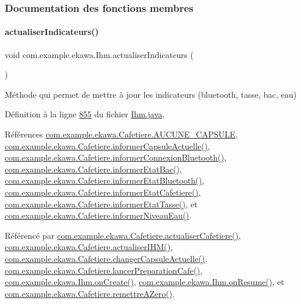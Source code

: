 \subsubsection{Documentation des fonctions membres}
\mbox{\label{classcom_1_1example_1_1ekawa_1_1_ihm_a2c3740dd5be20b3111b36649514fd41e}} 
\paragraph{\texorpdfstring{actualiser\+Indicateurs()}{actualiserIndicateurs()}}
{\footnotesize\ttfamily void com.\+example.\+ekawa.\+Ihm.\+actualiser\+Indicateurs (\begin{DoxyParamCaption}{ }\end{DoxyParamCaption})}



Méthode qui permet de mettre à jour les indicateurs (bluetooth, tasse, bac, eau) 



Définition à la ligne \hyperlink{_ihm_8java_source_l00855}{855} du fichier \hyperlink{_ihm_8java_source}{Ihm.\+java}.



Références \hyperlink{_cafetiere_8java_source_l00028}{com.\+example.\+ekawa.\+Cafetiere.\+A\+U\+C\+U\+N\+E\+\_\+\+C\+A\+P\+S\+U\+LE}, \hyperlink{_cafetiere_8java_source_l00235}{com.\+example.\+ekawa.\+Cafetiere.\+informer\+Capsule\+Actuelle()}, \hyperlink{_cafetiere_8java_source_l00275}{com.\+example.\+ekawa.\+Cafetiere.\+informer\+Connexion\+Bluetooth()}, \hyperlink{_cafetiere_8java_source_l00295}{com.\+example.\+ekawa.\+Cafetiere.\+informer\+Etat\+Bac()}, \hyperlink{_cafetiere_8java_source_l00265}{com.\+example.\+ekawa.\+Cafetiere.\+informer\+Etat\+Bluetooth()}, \hyperlink{_cafetiere_8java_source_l00255}{com.\+example.\+ekawa.\+Cafetiere.\+informer\+Etat\+Cafetiere()}, \hyperlink{_cafetiere_8java_source_l00285}{com.\+example.\+ekawa.\+Cafetiere.\+informer\+Etat\+Tasse()}, et \hyperlink{_cafetiere_8java_source_l00305}{com.\+example.\+ekawa.\+Cafetiere.\+informer\+Niveau\+Eau()}.



Référencé par \hyperlink{_cafetiere_8java_source_l00543}{com.\+example.\+ekawa.\+Cafetiere.\+actualiser\+Cafetiere()}, \hyperlink{_cafetiere_8java_source_l00674}{com.\+example.\+ekawa.\+Cafetiere.\+actualiser\+I\+H\+M()}, \hyperlink{_cafetiere_8java_source_l00212}{com.\+example.\+ekawa.\+Cafetiere.\+changer\+Capsule\+Actuelle()}, \hyperlink{_cafetiere_8java_source_l00527}{com.\+example.\+ekawa.\+Cafetiere.\+lancer\+Preparation\+Cafe()}, \hyperlink{_ihm_8java_source_l00248}{com.\+example.\+ekawa.\+Ihm.\+on\+Create()}, \hyperlink{_ihm_8java_source_l00284}{com.\+example.\+ekawa.\+Ihm.\+on\+Resume()}, et \hyperlink{_cafetiere_8java_source_l00658}{com.\+example.\+ekawa.\+Cafetiere.\+remettre\+A\+Zero()}.


